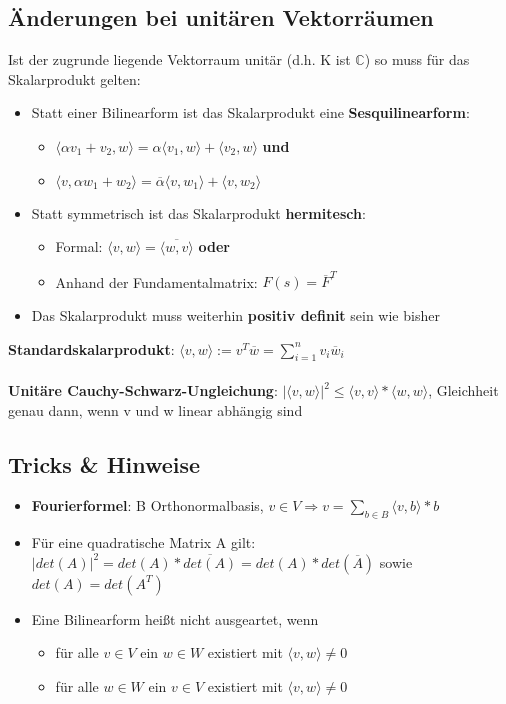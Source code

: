 \documentclass[10pt,a4paper]{article}
\def\complexnumbers{{\mathbb{C}}}
\begin{document}
	\subsection{Änderungen bei unitären Vektorräumen}
	\label{sp:sub:aenderungen_bei_unitaeren_vektorraeumen}
	
	Ist der zugrunde liegende Vektorraum unitär (d.h. K ist $\complexnumbers$) so muss für das Skalarprodukt gelten:
	\begin{itemize}
		\item Statt einer Bilinearform ist das Skalarprodukt eine \textbf{Sesquilinearform}:
		\begin{itemize}
			\item $\langle \alpha v_1 + v_2, w\rangle = \alpha\langle  v_1, w\rangle + \langle v_2, w\rangle$ \textbf{und}
			\item $\langle v, \alpha w_1 + w_2\rangle = \overline{\alpha}\langle  v, w_1\rangle + \langle v, w_2\rangle$
		\end{itemize}
		\item Statt symmetrisch ist das Skalarprodukt \textbf{hermitesch}:
			\begin{itemize}
				\item Formal: $\langle v, w\rangle = \overline{\langle w, v\rangle}$ \textbf{oder}
				\item Anhand der Fundamentalmatrix: $F(s) = \overline{F}^T$
			\end{itemize}
		\item Das Skalarprodukt muss weiterhin \textbf{positiv definit} sein wie bisher
	\end{itemize}
	\textbf{Standardskalarprodukt}: $\langle v, w\rangle := v^T\overline{w} = \sum_{i = 1}^{n} v_i\overline{w}_i$\\\\
	\textbf{Unitäre Cauchy-Schwarz-Ungleichung}: $|\langle v, w\rangle|^2 \leq \langle v, v\rangle * \langle w, w\rangle$, Gleichheit genau dann, wenn v und w linear abhängig sind
	
	\subsection{Tricks \& Hinweise}
	\label{sp:sub:tricks_hinweise}
	
	\begin{itemize}
		\item \textbf{Fourierformel}: B Orthonormalbasis, $v \in V \Rightarrow v = \sum_{b \in B} \langle v, b\rangle * b$
		\item Für eine quadratische Matrix A gilt: $|det(A)|^2 = det(A) * \overline{det(A)} = det(A) * det(\overline{A})$ sowie $det(A) = det(A^T)$
		\item Eine Bilinearform heißt nicht ausgeartet, wenn
		\begin{itemize}
			\item für alle $v \in V$ ein $w \in W$ existiert mit $\langle v, w\rangle \neq 0$
			\item für alle $w \in W$ ein $v \in V$ existiert mit $\langle v, w\rangle \neq 0$
		\end{itemize}
	\end{itemize}
\end{document}
